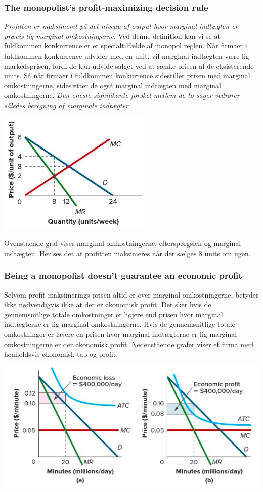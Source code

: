 \subsubsection{The monopolist's profit-maximizing decision rule}
\textit{Profitten er maksimeret på det niveau af output hvor marginal indtægten er præcis lig marginal omkostningerne}. Ved denne definition kan vi se at fuldkommen konkurrence er et specialtilfælde af monopol reglen. Når firmaer i fuldkommen konkurrence udvider med en unit, vil marginal indtægten være lig markedsprisen, fordi de kan udvide salget ved at sænke prisen af de eksisterende units. Så når firmaer i fuldkommen konkurrence sidestiller prisen med marginal omkostningerne, sidesætter de også marginal indtægten med marginal omkostningerne. \textit{Den eneste signifikante forskel mellem de to sager vedrører således beregning af marginale indtægter}

\includegraphics[scale=0.8]{Afsnit/Lektion4/maksimeringafprofit.png} \label{marginalindtægt}

Ovenstående graf viser marginal omkostningerne, efterspørgslen og marginal indtægten. Her ses det at profitten maksimeres når der sælges 8 units om ugen. 

\subsubsection{Being a monopolist doesn't guarantee an economic profit}
Selvom profit maksimerings prisen altid er over marginal omkostningerne, betyder ikke nødvendigvis ikke at der er økonomisk profit. Det sker hvis de gennemsnitlige totale omkostninger er højere end prisen hvor marginal indtægterne er lig marginal omkostningerne. Hvis de gennemsnitlige totale omkostninger er lavere en prisen hvor marginal indtægterne er lig marginal omkostningerne er der økonomisk profit. Nedenstående grafer viser et firma med henholdsvis økonomisk tab og profit. 

\includegraphics[scale=0.6]{Afsnit/Lektion4/tabogprofit.png}

